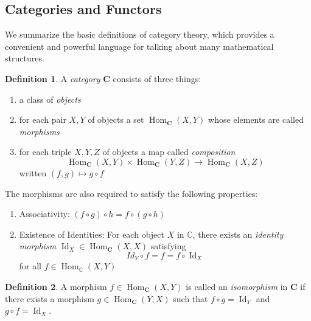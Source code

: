 \documentclass{article}
\DeclareMathOperator{\Id}{Id}
\DeclareMathOperator{\Hom}{Hom}
\theoremstyle{remark}
\theoremstyle{definition}
\newtheorem{definition}{Definition}[section]
\begin{document}
\subsection{Categories and Functors}
We summarize the basic definitions of category theory, which provides a convenient and powerful language for talking about many mathematical structures. 

\begin{definition}
A \textit{category} $\mathbf{C}$ consists of three things: 
\begin{enumerate}
    \item a class of \textit{objects}
    \item for each pair $X, Y$ of objects a set $\Hom_\mathbf{C} (X, Y)$ whose elements are called \textit{morphisms}
    \item for each triple $X, Y, Z$ of objects a map called \textit{composition}
    \[\Hom_\mathbf{C} (X, Y) \times \Hom_\mathbf{C} (Y, Z) \longrightarrow \Hom_\mathbf{C} (X, Z)\]
    written $(f, g) \mapsto g \circ f$
\end{enumerate}
The morphisms are also required to satisfy the following properties: 
\begin{enumerate}
    \item Associativity: $(f \circ g) \circ h = f \circ (g \circ h)$
    \item Existence of Identities: For each object $X$ in $\mathbb{C}$, there exists an \textit{identity morphism} $\Id_X \in \Hom_{\mathbf{C}}(X, X)$ satisfying 
    \[Id_Y \circ f = f = f \circ \Id_X\]
    for all $f \in \Hom_\mathbb{C} (X, Y)$
\end{enumerate}
\end{definition}

\begin{definition}
A morphism $f \in \Hom_\mathbf{C}(X, Y)$ is called an \textit{isomorphism} in $\mathbf{C}$ if there exists a morphism $g \in \Hom_\mathbf{C} (Y, X)$ such that $f \circ g = \Id_Y$ and $g \circ f = \Id_X$. 
\end{definition}
\end{document}
